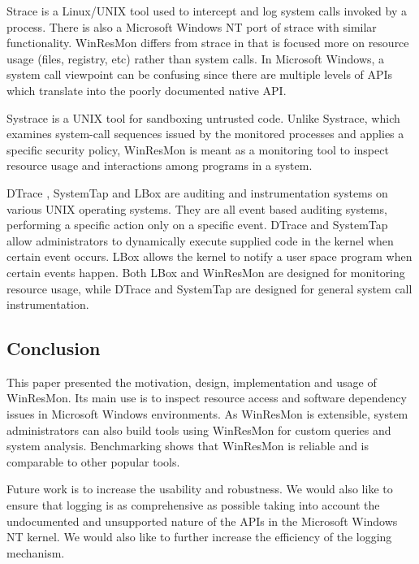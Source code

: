 Strace \cite{strace} is a Linux/UNIX tool used to intercept and log system
calls invoked by a process.  There is also a Microsoft Windows NT port of
strace \cite{bindview} with similar functionality.  WinResMon differs from
strace in that is focused more on resource usage (files, registry, etc) rather
than system calls.  In Microsoft Windows, a system call viewpoint can be
confusing since there are multiple levels of APIs which translate into the poorly
documented native API.

Systrace \cite{systrace} is a UNIX tool for sandboxing untrusted code.  Unlike
Systrace, which examines system-call sequences issued by the monitored
processes and applies a specific security policy, WinResMon is meant as a
monitoring tool to inspect resource usage and interactions among programs in a
system.

DTrace \cite{dtrace}, SystemTap \cite{systemtap} and LBox \cite{lbox} are
auditing and instrumentation systems on various UNIX operating systems.  They
are all event based auditing systems, performing a specific action only on a
specific event.  DTrace and SystemTap allow administrators to dynamically
execute supplied code in the kernel when certain event occurs.  LBox allows
the kernel to notify a user space program when certain events happen.  Both
LBox and WinResMon are designed for monitoring resource usage, while DTrace and
SystemTap are designed for general system call instrumentation.


\subsection{Conclusion}

This paper presented the motivation, design, implementation and usage of
WinResMon.  Its main use is to inspect resource access and software dependency
issues in Microsoft Windows environments.  As WinResMon is extensible, system
administrators can also build tools using WinResMon for custom queries and
system analysis.  Benchmarking shows that WinResMon is reliable and is
comparable to other popular tools.

Future work is to increase the usability and robustness.
We would also like to ensure that logging is as comprehensive as possible
taking into account the undocumented
and unsupported nature of the APIs in the Microsoft Windows NT kernel.
We would also like to further increase the efficiency of the
logging mechanism.


